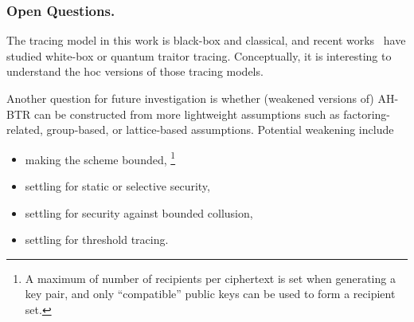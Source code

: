 \subsubsection{Open Questions.}
The tracing model in this work is black-box and classical, and recent works~\cite{C:Zhandry21,TCC:Zhandry20} have studied white-box or quantum traitor tracing.
Conceptually, it is interesting to understand the \ad hoc versions of those tracing models.

Another question for future investigation is whether
(weakened versions of) AH-BTR can be constructed from more lightweight assumptions such as factoring-related, group-based, or lattice-based assumptions.
Potential weakening include
\begin{itemize}
\item making the scheme bounded,%
\footnote{A maximum of number of recipients per ciphertext is set when generating a key pair, and only ``compatible'' public keys can be used to form a recipient set.}
\item settling for static or selective security,
\item settling for security against bounded collusion,
\item settling for threshold tracing.
\end{itemize}
